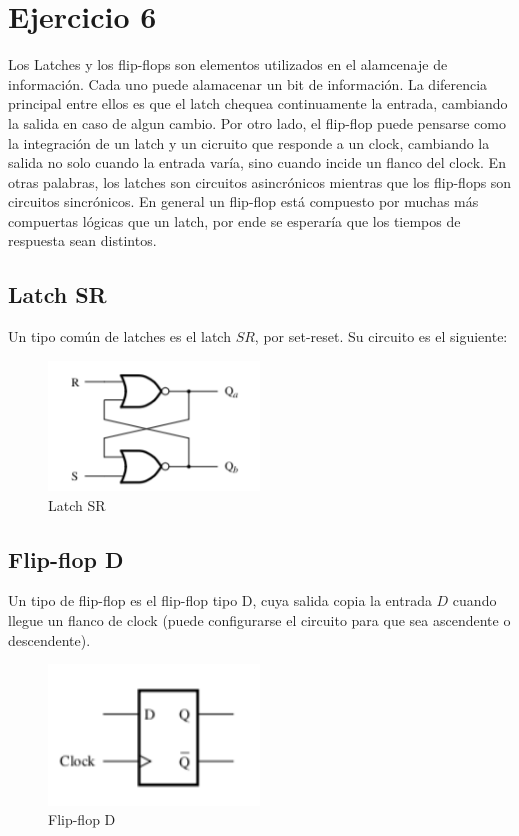 \section{Ejercicio 6}


Los Latches y los flip-flops son elementos utilizados en el alamcenaje de información. Cada uno puede alamacenar un bit de información. La diferencia principal entre ellos es que el latch chequea continuamente la entrada, cambiando la salida en caso de algun cambio. Por otro lado, el flip-flop puede pensarse como la integración de un latch y un cicruito que responde a un clock, cambiando la salida no solo cuando la entrada varía, sino cuando incide un flanco del clock. En otras palabras, los latches son circuitos asincrónicos mientras que los flip-flops son circuitos sincrónicos. En general un flip-flop está compuesto por muchas más compuertas lógicas que un latch, por ende se esperaría que los tiempos de respuesta sean distintos. 




\subsection{Latch SR}

Un tipo común de latches es el latch $SR$, por set-reset. Su circuito es el siguiente:

\begin{figure}[H]
	\centering
	\includegraphics[width=0.5\textwidth]{Ejercicio6/Recursos/latchSR}
	\caption{Latch SR}
\end{figure}



\subsection{Flip-flop D}
Un tipo de flip-flop es el flip-flop tipo D, cuya salida copia la entrada $D$ cuando llegue un flanco de clock (puede configurarse el circuito para que sea ascendente o descendente). 

\begin{figure}[H]
	\centering
	\includegraphics[width=0.5\textwidth]{Ejercicio6/Recursos/flipflopD}
	\caption{Flip-flop D}
\end{figure}

